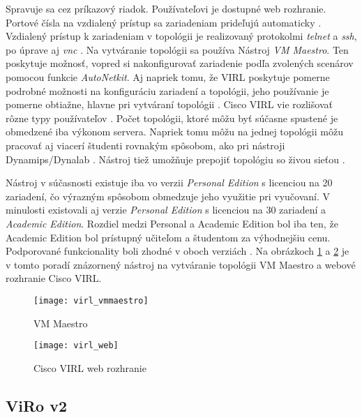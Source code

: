 Spravuje sa cez príkazový riadok. Používateľovi je dostupné web rozhranie. Portové čísla na vzdialený prístup sa zariadeniam prideľujú automaticky \cite{virl_interfacett_1}. Vzdialený prístup k zariadeniam v topológii je realizovaný protokolmi \emph{telnet} a \emph{ssh}, po úprave aj \emph{vnc} \cite{virl_ciscoskills, virl_speaknetworks}. Na vytváranie topológii sa používa Nástroj \emph{VM Maestro}. Ten poskytuje možnosť, vopred si nakonfigurovať zariadenie podľa zvolených scenárov pomocou funkcie \emph{AutoNetkit}. Aj napriek tomu, že VIRL poskytuje pomerne podrobné možnosti na konfiguráciu zariadení a topológii, jeho používanie je pomerne obtiažne, hlavne pri vytváraní topológii \cite{virl_interfacett_1, virl_interfacett_2}. Cisco VIRL vie rozlišovať rôzne typy používateľov \cite{virl_cisco_features}. Počet topológii, ktoré môžu byť súčasne spustené je obmedzené iba výkonom servera. Napriek tomu môžu na jednej topológii môžu pracovať aj viacerí študenti rovnakým spôsobom, ako pri nástroji Dynamips/Dynalab \cite{virl_interfacett_2}. Nástroj tiež umožňuje prepojiť topológiu so živou sieťou \cite{virl_speaknetworks}. 

Nástroj v súčasnosti existuje iba vo verzii \emph{Personal Edition} s licenciou na 20 zariadení, čo výrazným spôsobom obmedzuje jeho využitie pri vyučovaní. V minulosti existovali aj verzie \emph{Personal Edition} s licenciou na 30 zariadení a \emph{Academic Edition}. Rozdiel medzi Personal a Academic Edition bol iba ten, že Academic Edition bol prístupný učiteľom a študentom za výhodnejšiu cenu. Podporované funkcionality boli zhodné v oboch verziách \cite{virl_edition_differences}. Na obrázkoch \ref{obr:virl_vmmaestro} a \ref{obr:virl_web} je v tomto poradí znázornený nástroj na vytváranie topológii VM Maestro a webové rozhranie Cisco VIRL.

\begin{figure}
    \centering
    \texttt{[image: virl\_vmmaestro]}
    \caption{VM Maestro} \cite{obr_virl_vmmaestro}
    \label{obr:virl_vmmaestro}
\end{figure}

\begin{figure}
    \centering
    \texttt{[image: virl\_web]}
    \caption{Cisco VIRL web rozhranie} \cite{obr_virl_web}
    \label{obr:virl_web}
\end{figure}

\subsection{ViRo v2}

